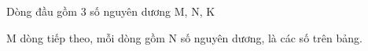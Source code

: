 Dòng đầu gồm 3 số nguyên dương M, N, K

M dòng tiếp theo, mỗi dòng gồm N số nguyên dương, là các số trên bảng.